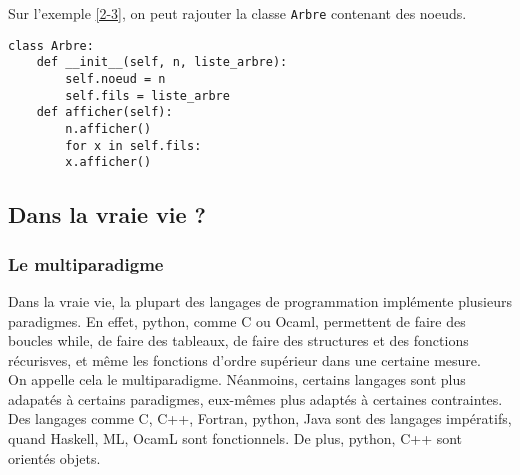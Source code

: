\begin{example}
	Sur l'exemple \ref{2-3}, on peut rajouter la classe \lstinline|Arbre| contenant des noeuds.
	\begin{lstlisting}
class Arbre:
    def __init__(self, n, liste_arbre):
        self.noeud = n
        self.fils = liste_arbre
    def afficher(self):
        n.afficher()
        for x in self.fils:
        x.afficher()
	\end{lstlisting}
\end{example}

\subsection{Dans la vraie vie ?}

\subsubsection{Le multiparadigme}

	Dans la vraie vie, la plupart des langages de programmation implémente plusieurs paradigmes. En effet, python, comme C ou Ocaml, permettent de faire des boucles while, de faire des tableaux, de faire des structures et des fonctions récurisves, et même les fonctions d'ordre supérieur dans une certaine mesure.\\
	
	On appelle cela le multiparadigme. Néanmoins, certains langages sont plus adapatés à certains paradigmes, eux-mêmes plus adaptés à certaines contraintes.\\
	
	Des langages comme C, C++, Fortran, python, Java sont des langages impératifs, quand Haskell, ML, OcamL sont fonctionnels. De plus, python, C++ sont orientés objets.

